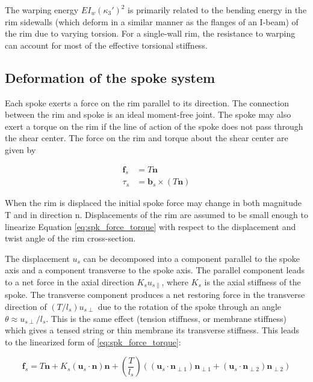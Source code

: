 \documentclass[../thesis.tex]{subfiles}
\newcommand{\n}{\mathbf{n}}
\newcommand{\npo}{\mathbf{n}_{\perp 1}}
\newcommand{\npt}{\mathbf{n}_{\perp 2}}
\newcommand{\bs}{\mathbf{b}_s}
\begin{document}
The warping energy $EI_w(\kappa_3')^2$ is primarily related to the bending energy in the rim sidewalls (which deform in a similar manner as the flanges of an I-beam) of the rim due to varying torsion. For a single-wall rim, the resistance to warping can account for most of the effective torsional stiffness.

\subsection{Deformation of the spoke system}

Each spoke exerts a force on the rim parallel to its direction. The connection between the rim and spoke is an ideal moment-free joint. The spoke may also exert a torque on the rim if the line of action of the spoke does not pass through the shear center. The force on the rim and torque about the shear center are given by

\begin{subequations}
\label{eq:spk_force_torque}
\begin{align}
\mathbf{f}_s &= T\mathbf{n}\\
\tau_s &= \bs \times ( T\mathbf{n} )
\end{align}
\end{subequations}

When the rim is displaced the initial spoke force may change in both magnitude T and in direction n. Displacements of the rim are assumed to be small enough to linearize Equation \eqref{eq:spk_force_torque} with respect to the displacement and twist angle of the rim cross-section.

The displacement $u_s$ can be decomposed into a component parallel to the spoke axis and a component transverse to the spoke axis. The parallel component leads to a net force in the axial direction $K_s u_{s\parallel}$, where $K_s$ is the axial stiffness of the spoke. The transverse component produces a net restoring force in the transverse direction of $(T/l_s) u_{s\perp}$ due to the rotation of the spoke through an angle $\theta \approx u_{s\perp}/l_s$. This is the same effect (tension stiffness, or membrane stiffness) which gives a tensed string or thin membrane its transverse stiffness. This leads to the linearized form of \eqref{eq:spk_force_torque}:

\begin{equation}
\label{eq:fs_us}
\mathbf{f}_s = T\n +
    K_s (\mathbf{u}_s \cdot \n)\n +
    \left(\frac{T}{l_s}\right) \left((\mathbf{u}_s \cdot \npo ) \npo +
                                     (\mathbf{u}_s \cdot \npt ) \npt \right)
\end{equation}
\end{document}
